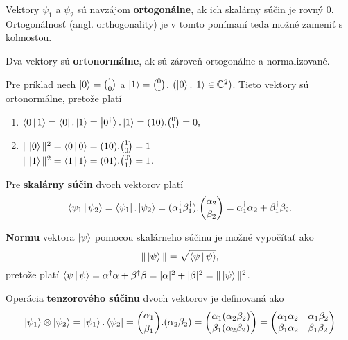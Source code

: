 Vektory \(\psi_1\) a \(\psi_2\) sú navzájom \textbf{ortogonálne}, ak ich skalárny súčin je rovný 0. Ortogonálnosť (angl. orthogonality) je v tomto ponímaní teda možné zameniť s kolmosťou.

Dva vektory sú \textbf{ortonormálne}, ak sú zároveň ortogonálne a normalizované.

Pre príklad nech \(\Ket{0} = \binom{1}{0}\) a \(\Ket{1} = \binom{0}{1}\), \( (\Ket{0}, \Ket{1} \in \mathbb{C}^2) \).
Tieto vektory sú ortonormálne, pretože platí 
\begin{enumerate}
\item \(\Braket{0|1} = \Bra{0} . \Ket{1} = \Ket{0^{\dag}} . \Ket{1} = (1 0) . \binom{0}{1} = 0,\)
\item \(\Vert \Ket{0} \Vert^2 = \Braket{0|0} = (1 0) . \binom{1}{0} = 1\) \\
\(\Vert \Ket{1} \Vert^2 = \Braket{1|1} = (0 1) . \binom{0}{1} = 1\).
\end{enumerate}

Pre \textbf{skalárny súčin} dvoch vektorov platí
\[\Braket{\psi_1|\psi_2} = \Bra{\psi_1} . \Ket{\psi_2} = (\alpha_1^{\dag}\beta_1^{\dag}) . \binom{\alpha_2}{\beta_2} = \alpha_1^{\dag}\alpha_2 + \beta_1^{\dag}\beta_2.\]

\textbf{Normu} vektora \(\Ket{\psi}\) pomocou skalárneho súčinu je možné vypočítať ako
\[\Vert \Ket{\psi} \Vert = \sqrt{\Braket{\psi|\psi}},\]
pretože platí \(\Braket{\psi|\psi} = \alpha^{\dag}\alpha + \beta^{\dag}\beta = |\alpha|^2 + |\beta|^2 = \Vert \Ket{\psi} \Vert^2\).

Operácia \textbf{tenzorového súčinu} dvoch vektorov je definovaná ako
\[
\Ket{\psi_1} \otimes \Ket{\psi_2} = \Ket{\psi_1} . \Bra{\psi_2} = \binom{\alpha_1}{\beta_1} . (\alpha_2\beta_2) = 
\begin{pmatrix}
	\alpha_1(\alpha_2\beta_2) \\ 
	\beta_1(\alpha_2\beta_2)
\end{pmatrix} = 
\begin{pmatrix}
	\alpha_1\alpha_2 \quad \alpha_1\beta_2 \\
	\beta_1\alpha_2 \quad \beta_1\beta_2
\end{pmatrix}
\]
